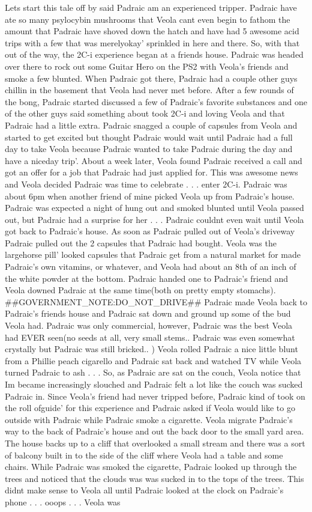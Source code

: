 \documentclass[12pt]{book}
\begin{document}
Lets start this tale off by said Padraic am an experienced tripper. Padraic have ate so many psylocybin mushrooms that Veola cant even begin to fathom the amount that Padraic have shoved down the hatch and have had 5 awesome acid trips with a few that was merelyokay' sprinkled in here and there. So, with that out of the way, the 2C-i experience began at a friends house. Padraic was headed over there to rock out some Guitar Hero on the PS2 with Veola's friends and smoke a few blunted. When Padraic got there, Padraic had a couple other guys chillin in the basement that Veola had never met before. After a few rounds of the bong, Padraic started discussed a few of Padraic's favorite substances and one of the other guys said something about took 2C-i and loving Veola and that Padraic had a little extra. Padraic snagged a couple of capsules from Veola and started to get excited but thought Padraic would wait until Padraic had a full day to take Veola because Padraic wanted to take Padraic during the day and have a niceday trip'. About a week later, Veola found Padraic received a call and got an offer for a job that Padraic had just applied for. This was awesome news and Veola decided Padraic was time to celebrate . . .  enter 2C-i. Padraic was about 6pm when another friend of mine picked Veola up from Padraic's house. Padraic was expected a night of hung out and smoked blunted until Veola passed out, but Padraic had a surprise for her . . .  Padraic couldnt even wait until Veola got back to Padraic's house. As soon as Padraic pulled out of Veola's driveway Padraic pulled out the 2 capsules that Padraic had bought. Veola was the largehorse pill' looked capsules that Padraic get from a natural market for made Padraic's own vitamins, or whatever, and Veola had about an 8th of an inch of the white powder at the bottom. Padraic handed one to Padraic's friend and Veola downed Padraic at the same time(both on pretty empty stomachs). \#\#GOVERNMENT\_NOTE:DO\_NOT\_DRIVE\#\# Padraic made Veola back to Padraic's friends house and Padraic sat down and ground up some of the bud Veola had. Padraic was only commercial, however, Padraic was the best Veola had EVER seen(no seeds at all, very small stems.. Padraic was even somewhat crystally but Padraic was still bricked.. ) Veola rolled Padraic a nice little blunt from a Phillie peach cigarello and Padraic sat back and watched TV while Veola turned Padraic to ash . . .  So, as Padraic are sat on the couch, Veola notice that Im became increasingly slouched and Padraic felt a lot like the couch was sucked Padraic in. Since Veola's friend had never tripped before, Padraic kind of took on the roll ofguide' for this experience and Padraic asked if Veola would like to go outside with Padraic while Padraic smoke a cigarette. Veola migrate Padraic's way to the back of Padraic's house and out the back door to the small yard area. The house backs up to a cliff that overlooked a small stream and there was a sort of balcony built in to the side of the cliff where Veola had a table and some chairs. While Padraic was smoked the cigarette, Padraic looked up through the trees and noticed that the clouds was was sucked in to the tops of the trees. This didnt make sense to Veola all until Padraic looked at the clock on Padraic's phone . . .  ooops . . .  Veola was 
\end{document}
